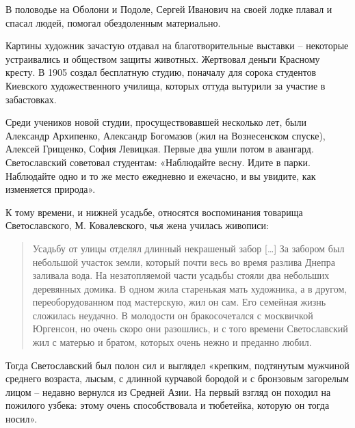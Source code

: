 В половодье на Оболони и Подоле, Сергей Иванович на своей лодке плавал и спасал людей, помогал обездоленным материально.

Картины художник зачастую отдавал на благотворительные выставки – некоторые устраивались и обществом защиты животных. Жертвовал деньги Красному кресту. В 1905 создал бесплатную студию, поначалу для сорока студентов Киевского художественного училища, которых оттуда вытурили за участие в забастовках.

Среди учеников новой студии, просуществовавшей несколько лет, были Александр Архипенко, Александр Богомазов (жил на Вознесенском спуске), Алексей Грищенко, София Левицкая. Первые два ушли потом в авангард. Светославский советовал студентам: «Наблюдайте весну. Идите в парки. Наблюдайте одно и то же место ежедневно и ежечасно, и вы увидите, как изменяется природа».

К тому времени, и нижней усадьбе, относятся воспоминания товарища Светославского, М. Ковалевского, чья жена училась живописи:

\begin{quotation}
Усадьбу от улицы отделял длинный некрашеный забор […] За забором был небольшой участок земли, который почти весь во время разлива Днепра заливала вода. На незатопляемой части усадьбы стояли два небольших деревянных домика. В одном жила старенькая мать художника, а в другом, переоборудованном под мастерскую, жил он сам. Его семейная жизнь сложилась неудачно. В молодости он бракосочетался с москвичкой Юргенсон, но очень скоро они разошлись, и с того времени Светославский жил с матерью и братом, которых очень нежно и преданно любил.
\end{quotation}

Тогда Светославский был полон сил и выглядел «крепким, подтянутым мужчиной среднего возраста, лысым, с длинной курчавой бородой и с бронзовым загорелым лицом – недавно вернулся из Средней Азии. На первый взгляд он походил на пожилого узбека: этому очень способствовала и тюбетейка, которую он тогда носил».

\vspace*{\fill}

